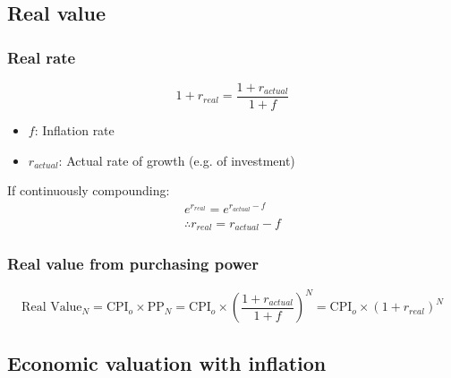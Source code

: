 \subsection{Real value}
\subsubsection{Real rate}
    \begin{definition}
        \begin{equation}
            1 + r_{real} = \frac{1 + r_{actual}}{1 + f}
        \end{equation}
        \begin{itemize}
            \item \(f\): Inflation rate
            \item \(r_{actual}\): Actual rate of growth (e.g. of investment)
        \end{itemize}
        \vspace{1em}

        If continuously compounding: 
        \begin{align}
            e^{r_{real}} = e^{r_{actual} - f} \\
            \therefore r_{real} = r_{actual} - f
        \end{align}
        
    \end{definition}

\subsubsection{Real value from purchasing power}
    \begin{definition}
        \begin{equation}
            \text{Real Value}_N = \text{CPI}_o \times \text{PP}_N = \text{CPI}_o \times \left (\frac{1 + r_{actual}}{1 + f} \right)^N = \text{CPI}_o \times (1 + r_{real})^N
        \end{equation}        
    \end{definition}

\subsection{Economic valuation with inflation}

